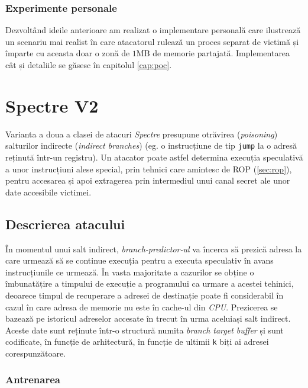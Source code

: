 \subsubsection{Experimente personale}

Dezvoltând ideile anterioare am realizat o implementare personală care
ilustrează un scenariu mai realist în care atacatorul rulează un proces separat
de victimă și împarte cu aceasta doar o zonă de $1$MB de memorie partajată.
Implementarea cât și detaliile se găsesc în capitolul \ref{cap:poc}.

\section{Spectre V2}

Varianta a doua a clasei de atacuri \emph{Spectre} presupune otrăvirea
(\emph{poisoning}) salturilor indirecte (\emph{indirect branches}) (eg. o
instrucțiune de tip \texttt{jump} la o adresă reținută într-un registru). Un
atacator poate astfel determina execuția speculativă a unor instrucțiuni alese
special, prin tehnici care amintesc de ROP (\ref{sec:rop}), pentru accesarea și
apoi extragerea prin intermediul unui canal secret ale unor date accesibile
victimei.

\subsection{Descrierea atacului}

În momentul unui salt indirect, \emph{branch-predictor-ul} va încerca să
prezică adresa la care urmează să se continue execuția pentru a executa
speculativ în avans instrucțiunile ce urmează. În vasta majoritate a cazurilor
se obține o îmbunatățire a timpului de execuție a programului ca urmare a
acestei tehinici, deoarece timpul de recuperare a adresei de destinație poate
fi considerabil în cazul în care adresa de memorie nu este în cache-ul din
\emph{CPU}. Prezicerea se bazează pe istoricul adreselor accesate în trecut în
urma aceluiași salt indirect. Aceste date sunt reținute într-o structură numita
\emph{branch target buffer} și sunt codificate, în funcție de arhitectură, în
funcție de ultimii \texttt{k} biți ai adresei corespunzătoare.

\subsubsection{Antrenarea}

